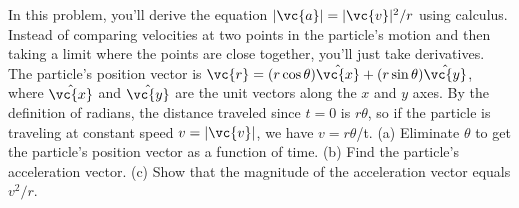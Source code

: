 In this problem, you'll derive the equation
$|\vc{a}|=|\vc{v}|^2/r$ using calculus. Instead of comparing
velocities at two points in the particle's motion and then
taking a limit where the points are close together, you'll
just take derivatives. The particle's position vector is
$\vc{r}=(r \cos\theta)\hat{\vc{x}} + (r\sin\theta)\hat{\vc{y}}$, where $\hat{\vc{x}}$ and $\hat{\vc{y}}$
are the unit vectors along the $x$ and $y$ axes. By the
definition of radians, the distance traveled since $t=0$ is
$r\theta $, so if the particle is traveling at constant
speed $v=|\vc{v}|$, we have $v=r\theta $/t.\hwendpart
 (a) Eliminate $\theta$ to get the particle's position vector as a function of
time.\hwendpart
 (b) Find the particle's acceleration vector.\hwendpart
 (c) Show
that the magnitude of the acceleration vector equals $v^2/r$.
